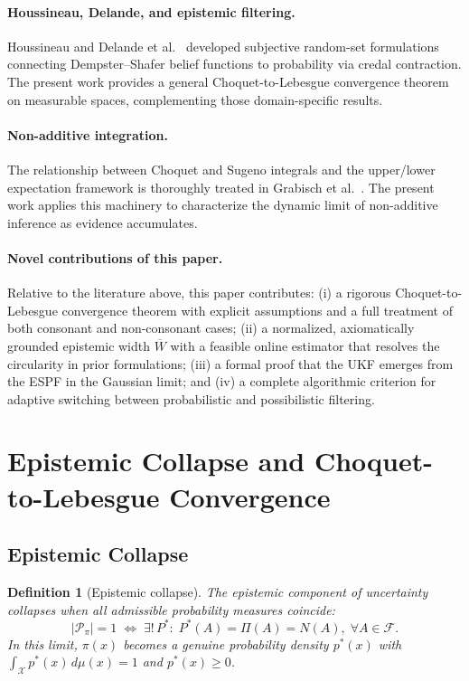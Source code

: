 \documentclass[12pt]{article}
\newtheorem{definition}[theorem]{Definition}
\newcommand{\Ppi}{\mathcal{P}_\pi}
\newcommand{\calF}{\mathcal{F}}
\newcommand{\calX}{\mathcal{X}}
\begin{document}
\paragraph{Houssineau, Delande, and epistemic filtering.}
Houssineau \cite{houssineau2016} and Delande et al.\ \cite{delande2017,delande2020}
developed subjective random-set formulations connecting Dempster--Shafer
belief functions to probability via credal contraction.
The present work provides a general Choquet-to-Lebesgue convergence
theorem on measurable spaces, complementing those domain-specific results.

\paragraph{Non-additive integration.}
The relationship between Choquet and Sugeno integrals and the upper/lower
expectation framework is thoroughly treated in Grabisch et al.\ \cite{grabisch2016}.
The present work applies this machinery to characterize the dynamic limit
of non-additive inference as evidence accumulates.

\paragraph{Novel contributions of this paper.}
Relative to the literature above, this paper contributes:
(i) a rigorous Choquet-to-Lebesgue convergence theorem with explicit assumptions
and a full treatment of both consonant and non-consonant cases;
(ii) a normalized, axiomatically grounded epistemic width $\overline{W}$ with
a feasible online estimator that resolves the circularity in prior formulations;
(iii) a formal proof that the UKF emerges from the ESPF in the Gaussian limit;
and
(iv) a complete algorithmic criterion for adaptive switching between probabilistic
and possibilistic filtering.

\section{Epistemic Collapse and Choquet-to-Lebesgue Convergence}
\label{sec:collapse}

\subsection{Epistemic Collapse}

\begin{definition}[Epistemic collapse]
\label{def:collapse}
The epistemic component of uncertainty \emph{collapses} when all admissible
probability measures coincide:
\begin{equation}
|\Ppi|=1
\;\Longleftrightarrow\;
\exists!\, P^*:\; P^*(A)=\Pi(A)=N(A),\;\forall A\in\calF.
\label{eq:collapse}
\end{equation}
In this limit, $\pi(x)$ becomes a genuine probability density $p^*(x)$
with $\int_\calX p^*(x)\,d\mu(x)=1$ and $p^*(x)\ge 0$.
\end{definition}
\end{document}
